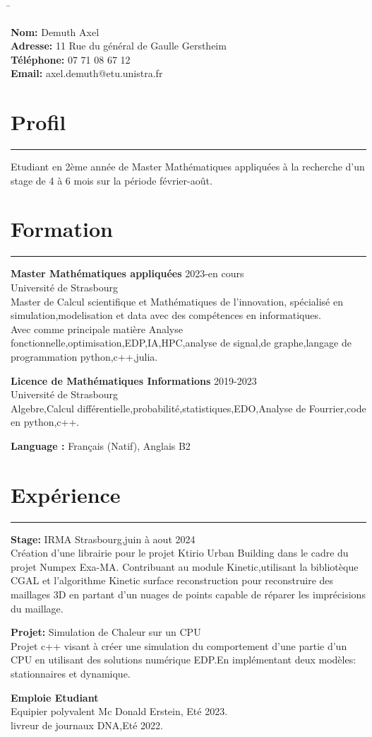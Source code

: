 \documentclass[a4paper,10pt]{article}
\newcommand{\personalinfo}[1]{
    \noindent
    \begin{tabbing}
    \hspace{2cm} \= \kill
    #1
    \end{tabbing}
}
\newcommand{\sectionline}{
    \noindent\rule{\textwidth}{0.5pt}
}
\begin{document}
\personalinfo{
    \textbf{Nom:} Demuth Axel \\
    \textbf{Adresse:} 11 Rue du général de Gaulle Gerstheim  \\
    \textbf{Téléphone:} 07 71 08 67 12 \\
    \textbf{Email:} axel.demuth@etu.unistra.fr
}

\section*{Profil}
\sectionline
Etudiant en 2ème année de Master Mathématiques appliquées à la recherche d'un stage de 4 à 6 mois sur la période février-août.\\

\section*{Formation}
\sectionline
\textbf{Master Mathématiques appliquées} 2023-en cours\\
Université de Strasbourg\\
Master de Calcul scientifique et Mathématiques de l'innovation, spécialisé en simulation,modelisation et data avec des compétences en informatiques.\\
Avec comme principale matière Analyse fonctionnelle,optimisation,EDP,IA,HPC,analyse de signal,de graphe,langage de programmation python,c++,julia.

\textbf{Licence de Mathématiques Informations} 2019-2023\\
Université de Strasbourg\\
Algebre,Calcul différentielle,probabilité,statistiques,EDO,Analyse de Fourrier,code en python,c++.

\textbf{Language :} 
Français (Natif), Anglais B2
\section*{Expérience}
\sectionline
\textbf{Stage: } IRMA Strasbourg,juin à aout 2024  \\
Création d'une librairie pour le projet Ktirio Urban Building dans le cadre du projet Numpex Exa-MA.
Contribuant au module Kinetic,utilisant la bibliotèque CGAL et l'algorithme Kinetic surface reconstruction 
pour reconstruire des maillages 3D en partant d'un nuages de points capable de réparer les imprécisions du maillage.

\noindent
\textbf{Projet: } Simulation de Chaleur sur un CPU\\
Projet c++ visant à créer une simulation du comportement d'une partie d'un CPU en utilisant des solutions numérique EDP.En implémentant deux modèles: stationnaires et dynamique.

\textbf{Emploie Etudiant} \\
Equipier polyvalent Mc Donald Erstein, Eté 2023.\\
livreur de journaux DNA,Eté 2022.
\end{document}
